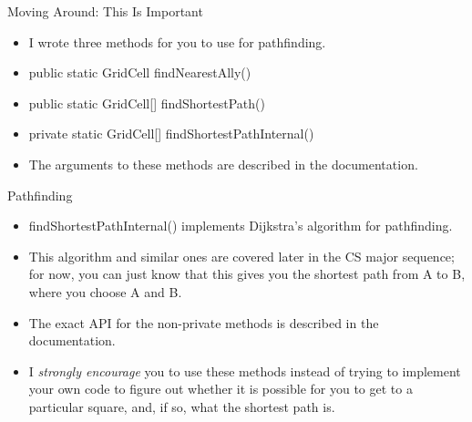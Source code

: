 \documentclass[aspectratio=169]{beamer}
\begin{document}
\begin{frame}{Moving Around: This Is Important}
 \begin{itemize}
  \item I wrote three methods for you to use for pathfinding.
  \item public static GridCell findNearestAlly()
  \item public static GridCell[] findShortestPath()
  \item private static GridCell[] findShortestPathInternal()
  \item The arguments to these methods are described in the
    documentation.
 \end{itemize}
\end{frame}

\begin{frame}{Pathfinding}
 \begin{itemize}
  \item findShortestPathInternal() implements Dijkstra's algorithm for
    pathfinding.
  \item This algorithm and similar ones are covered later in the CS
    major sequence; for now, you can just know that this gives you the
    shortest path from A to B, where you choose A and B.
  \item The exact API for the non-private methods is described in the
    documentation.
  \item I \emph{strongly encourage} you to use these methods instead
    of trying to implement your own code to figure out whether it is
    possible for you to get to a particular square, and, if so, what
    the shortest path is.
 \end{itemize}
\end{frame}
\end{document}

